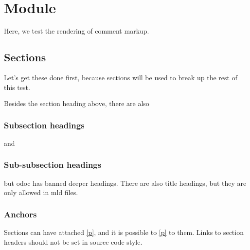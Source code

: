 \section{Module }\label{container-page-test+u+package+++ml-module-Markup}%
\begin{flushleft}\end{flushleft}%
Here, we test the rendering of comment markup.

\subsection{Sections\label{sections}}%
\begin{flushleft}\end{flushleft}%
Let's get these done first, because sections will be used to break up the rest of this test.

\begin{flushleft}\end{flushleft}%
Besides the section heading above, there are also

\subsubsection{Subsection headings\label{subsection-headings}}%
\begin{flushleft}\end{flushleft}%
and

\subsubsection{Sub-subsection headings\label{sub-subsection-headings}}%
\begin{flushleft}\end{flushleft}%
but odoc has banned deeper headings. There are also title headings, but they are only allowed in mld files.

\subsubsection{Anchors\label{anchors}}%
\begin{flushleft}\end{flushleft}%
Sections can have attached \hyperref[container-page-test+u+package+++ml-module-Markup-anchors]{[p\pageref*{container-page-test+u+package+++ml-module-Markup-anchors}]}, and it is possible to \hyperref[container-page-test+u+package+++ml-module-Markup-anchors]{[p\pageref*{container-page-test+u+package+++ml-module-Markup-anchors}]} to them. Links to section headers should not be set in source code style.

